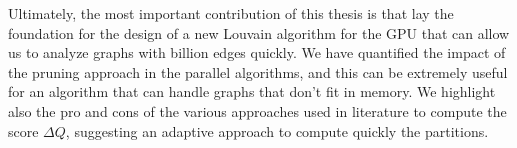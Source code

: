 Ultimately, the most important contribution of this thesis is that lay the foundation for the design of a new Louvain algorithm for the GPU that can allow us to analyze graphs with billion edges quickly. We have quantified the impact of the pruning approach in the parallel algorithms, and this can be extremely useful for an algorithm that can handle graphs that don't fit in memory. We highlight also the pro and cons of the various approaches used in literature to compute the score $\Delta Q$, suggesting an adaptive approach to compute quickly the partitions.